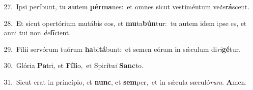 {\numbfont\textcolor{\numbcolor}{27.}}~Ipsi períbunt, tu \textbf{au}\-tem \textbf{pér}\-\textbf{ma}nes:~\star et omnes sicut vestiméntum ve\-\textit{te}\-\textbf{rá}scent.\par
{\numbfont\textcolor{\numbcolor}{28.}}~Et sicut opertórium mutábis eos, et \textbf{mu}\-ta\-\textbf{bún}\-tur:~\star tu autem idem ipse es, et anni tui non \textit{de}\-\textbf{fí}cient.\par
{\numbfont\textcolor{\numbcolor}{29.}}~Fílii servórum tuórum \textbf{ha}\-bi\-\textbf{tá}\-bunt:~\star et semen eórum in sǽculum di\-\textit{ri}\-\textbf{gé}tur.\par
{\numbfont\textcolor{\numbcolor}{30.}}~Glória \textbf{Pa}\-tri, et \textbf{Fí}\-\textbf{li}o,~\star et Spirítu\textit{i} \textbf{Sanc}\-to.\par
{\numbfont\textcolor{\numbcolor}{31.}}~Sicut erat in princípio, et \textbf{nunc}\-, et \textbf{sem}\-per,~\star et in sǽcula sæculó\-\textit{rum}\-. \textbf{A}\-men.\par
